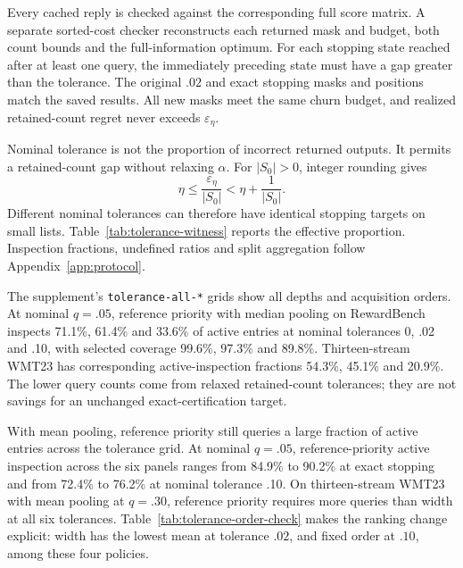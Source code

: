 Every cached reply is checked against the corresponding full score matrix. A separate sorted-cost checker reconstructs each returned mask and budget, both count bounds and the full-information optimum. For each stopping state reached after at least one query, the immediately preceding state must have a gap greater than the tolerance. The original $.02$ and exact stopping masks and positions match the saved results. All new masks meet the same churn budget, and realized retained-count regret never exceeds $\varepsilon_\eta$.

Nominal tolerance is not the proportion of incorrect returned outputs. It permits a retained-count gap without relaxing $\alpha$. For $|S_0|>0$, integer rounding gives
\[
 \eta\le\frac{\varepsilon_\eta}{|S_0|}<\eta+\frac1{|S_0|}.
\]
Different nominal tolerances can therefore have identical stopping targets on small lists. Table~\ref{tab:tolerance-witness} reports the effective proportion. Inspection fractions, undefined ratios and split aggregation follow Appendix~\ref{app:protocol}.

The supplement's \texttt{tolerance-all-*} grids show all depths and acquisition orders. At nominal $q=.05$, reference priority with median pooling on RewardBench inspects 71.1\%, 61.4\% and 33.6\% of active entries at nominal tolerances 0, .02 and .10, with selected coverage 99.6\%, 97.3\% and 89.8\%. Thirteen-stream WMT23 has corresponding active-inspection fractions 54.3\%, 45.1\% and 20.9\%. The lower query counts come from relaxed retained-count tolerances; they are not savings for an unchanged exact-certification target.

With mean pooling, reference priority still queries a large fraction of active entries across the tolerance grid. At nominal $q=.05$, reference-priority active inspection across the six panels ranges from 84.9\% to 90.2\% at exact stopping and from 72.4\% to 76.2\% at nominal tolerance .10. On thirteen-stream WMT23 with mean pooling at $q=.30$, reference priority requires more queries than width at all six tolerances. Table~\ref{tab:tolerance-order-check} makes the ranking change explicit: width has the lowest mean at tolerance $.02$, and fixed order at $.10$, among these four policies.



